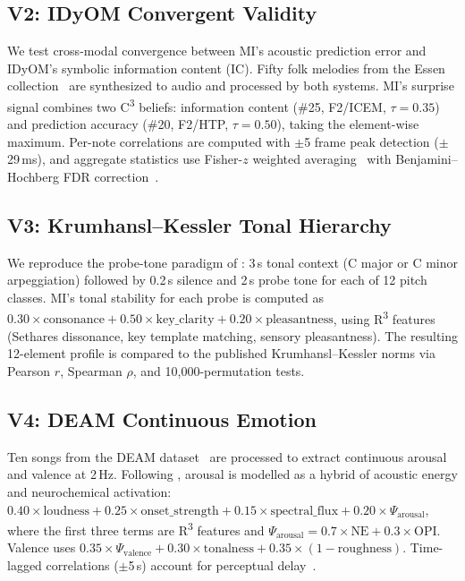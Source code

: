 \documentclass[twocolumn,10pt]{article}
\newcommand{\rthree}{R\textsuperscript{3}}
\newcommand{\cthree}{C\textsuperscript{3}}
\begin{document}
\subsection{V2: IDyOM Convergent Validity}

We test cross-modal convergence between MI's acoustic prediction error and IDyOM's symbolic information content (IC). Fifty folk melodies from the Essen collection~\citep{pearce2005} are synthesized to audio and processed by both systems. MI's surprise signal combines two \cthree{} beliefs: information content (\#25, F2/ICEM, $\tau = 0.35$) and prediction accuracy (\#20, F2/HTP, $\tau = 0.50$), taking the element-wise maximum. Per-note correlations are computed with $\pm$5 frame peak detection ($\pm$29\,ms), and aggregate statistics use Fisher-$z$ weighted averaging~\citep{fisher1921} with Benjamini--Hochberg FDR correction~\citep{benjamini1995}.

\subsection{V3: Krumhansl--Kessler Tonal Hierarchy}

We reproduce the probe-tone paradigm of \citet{krumhansl1982}: 3\,s tonal context (C major or C minor arpeggiation) followed by 0.2\,s silence and 2\,s probe tone for each of 12 pitch classes. MI's tonal stability for each probe is computed as $0.30 \times \text{consonance} + 0.50 \times \text{key\_clarity} + 0.20 \times \text{pleasantness}$, using \rthree{} features (Sethares dissonance, key template matching, sensory pleasantness). The resulting 12-element profile is compared to the published Krumhansl--Kessler norms via Pearson $r$, Spearman $\rho$, and 10,000-permutation tests.

\subsection{V4: DEAM Continuous Emotion}

Ten songs from the DEAM dataset~\citep{aljanaki2017} are processed to extract continuous arousal and valence at 2\,Hz. Following \citet{eerola2011}, arousal is modelled as a hybrid of acoustic energy and neurochemical activation: $0.40 \times \text{loudness} + 0.25 \times \text{onset\_strength} + 0.15 \times \text{spectral\_flux} + 0.20 \times \Psi_{\text{arousal}}$, where the first three terms are \rthree{} features and $\Psi_{\text{arousal}} = 0.7 \times \text{NE} + 0.3 \times \text{OPI}$. Valence uses $0.35 \times \Psi_{\text{valence}} + 0.30 \times \text{tonalness} + 0.35 \times (1 - \text{roughness})$. Time-lagged correlations ($\pm$5\,s) account for perceptual delay~\citep{gomez2007}.
\end{document}
